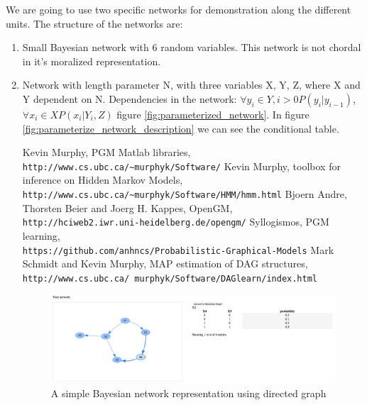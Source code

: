 \documentclass{article}
\begin{document}
    We are going to use two specific networks for demonstration along the different units. The structure of the networks are:
    \begin{enumerate}
        \item Small Bayesian network with 6 random variables. This network is not chordal in it's moralized representation.
        \item Network with length parameter N, with three variables X, Y, Z, where X and Y dependent on N. Dependencies in the network: $\forall y_i \in Y, i>0 P(y_i | y_{i-1})$, $\forall x_i \in X P(x_i | Y_i, Z)$ figure \ref{fig:parameterized_network}. In figure \ref{fig:parameterize_network_description} we can see the conditional table.

        \begin{thebibliography}{5}
        Kevin Murphy, PGM Matlab libraries, \\\texttt{http://www.cs.ubc.ca/\~{}murphyk/Software/}
        Kevin Murphy, toolbox for inference on Hidden Markov Models, \\\texttt{http://www.cs.ubc.ca/\~{}murphyk/Software/HMM/hmm.html}
        Bjoern Andre, Thorsten Beier and Joerg H. Kappes, OpenGM, \\\texttt{http://hciweb2.iwr.uni-heidelberg.de/opengm/}
        Syllogismos, PGM learning, \\\texttt{https://github.com/anhncs/Probabilistic-Graphical-Models}
        Mark Schmidt and Kevin Murphy, MAP estimation  of DAG structures, \\\texttt{http://www.cs.ubc.ca/~murphyk/Software/DAGlearn/index.html}
    \end{thebibliography}

    \begin{figure}[bp]
        \includegraphics[width=\textwidth]{img/network_one_highlighted.png}
        \centering
        \caption{A simple Bayesian network representation using directed graph}
        \label{fig:besian_network}
    \end{figure}


\end{enumerate}
\end{document}
